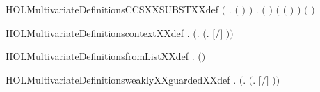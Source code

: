 \begin{SaveVerbatim}{HOLMultivariateDefinitionsCCSXXSUBSTXXdef}
   \ensuremath{(}\HOLSymConst{\HOLTokenForall{}} .
          \ensuremath{(} \ensuremath{)} \HOLSymConst{\ensuremath{=}}
          \HOLConst{\HOLTokenIn{}}         \ensuremath{)} \HOLSymConst{\HOLTokenConj{}}
   \HOLSymConst{\HOLTokenForall{}}  .
         \ensuremath{(}  \ensuremath{)} \HOLSymConst{\ensuremath{=}}
         \HOLConst{\HOLTokenIn{}}      \ensuremath{(} \ensuremath{(} \HOLSymConst{\ensuremath{\setminus}} \ensuremath{)} \ensuremath{)}
          \ensuremath{(}  \ensuremath{)}
\end{SaveVerbatim}
\newcommand{\HOLMultivariateDefinitionsCCSXXSUBSTXXdef}{\UseVerbatim{HOLMultivariateDefinitionsCCSXXSUBSTXXdef}}
\begin{SaveVerbatim}{HOLMultivariateDefinitionscontextXXdef}
\HOLTokenTurnstile{} \HOLSymConst{\HOLTokenForall{}} .    \HOLSymConst{\HOLTokenEquiv{}}  \ensuremath{(}\HOLTokenLambda{}.  \ensuremath{(}\HOLTokenLambda{}. \ensuremath{[}\ensuremath{/}\ensuremath{]} \ensuremath{)}\ensuremath{)} 
\end{SaveVerbatim}
\newcommand{\HOLMultivariateDefinitionscontextXXdef}{\UseVerbatim{HOLMultivariateDefinitionscontextXXdef}}
\begin{SaveVerbatim}{HOLMultivariateDefinitionsfromListXXdef}
\HOLTokenTurnstile{} \HOLSymConst{\HOLTokenForall{}} .    \HOLSymConst{\ensuremath{=}}  \HOLSymConst{|++}  \ensuremath{(}\HOLSymConst{,}\ensuremath{)}
\end{SaveVerbatim}
\newcommand{\HOLMultivariateDefinitionsfromListXXdef}{\UseVerbatim{HOLMultivariateDefinitionsfromListXXdef}}
\begin{SaveVerbatim}{HOLMultivariateDefinitionsweaklyXXguardedXXdef}
\HOLTokenTurnstile{} \HOLSymConst{\HOLTokenForall{}} .
          \HOLSymConst{\HOLTokenEquiv{}}  \ensuremath{(}\HOLTokenLambda{}.  \ensuremath{(}\HOLTokenLambda{}. \ensuremath{[}\ensuremath{/}\ensuremath{]} \ensuremath{)}\ensuremath{)} 
\end{SaveVerbatim}
